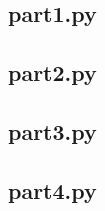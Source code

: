 \documentclass{article}
\begin{document}
\subsection{part1.py}


\subsection{part2.py}


\subsection{part3.py}


\subsection{part4.py}

\end{document}
